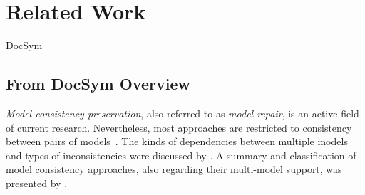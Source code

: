 \chapter{Related Work
}
\label{chap:relatedwork}


\begin{copiedFrom}{DocSym}

\section{From DocSym Overview}
\emph{Model consistency preservation}, also referred to as %
\emph{model repair}, is an active field of current research. 
Nevertheless, most approaches are restricted to consistency between pairs of models~\cite{stevens2017a}.
The kinds of dependencies between multiple models and types of inconsistencies were discussed by \textcite{kolovos2008a}. 
A summary and classification of model consistency approaches, also regarding their multi-model support, was presented by \textcite{macedo2015a}.


\end{copiedFrom}
